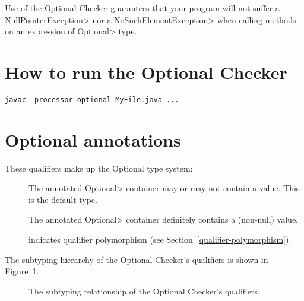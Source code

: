 Use of the Optional Checker guarantees that your program will not suffer a
\<NullPointerException> nor a \<NoSuchElementException> when calling
methods on an expression of \<Optional> type.


\section{How to run the Optional Checker\label{optional-run-checker}}

\begin{Verbatim}
javac -processor optional MyFile.java ...
\end{Verbatim}


\section{Optional annotations\label{optional-annotations}}

These qualifiers make up the Optional type system:

\begin{description}

\item[]
  The annotated \<Optional> container may or may not contain a value.
  This is the default type.

\item[]
  The annotated \<Optional> container definitely contains a (non-null) value.

\item[]
  indicates qualifier polymorphism (see Section~\ref{qualifier-polymorphism}).

\end{description}

The subtyping hierarchy of the Optional Checker's qualifiers is shown in
Figure~\ref{fig-optional-hierarchy}.

\begin{figure}
\caption{The subtyping relationship of the Optional Checker's qualifiers.}
\label{fig-optional-hierarchy}
\end{figure}

